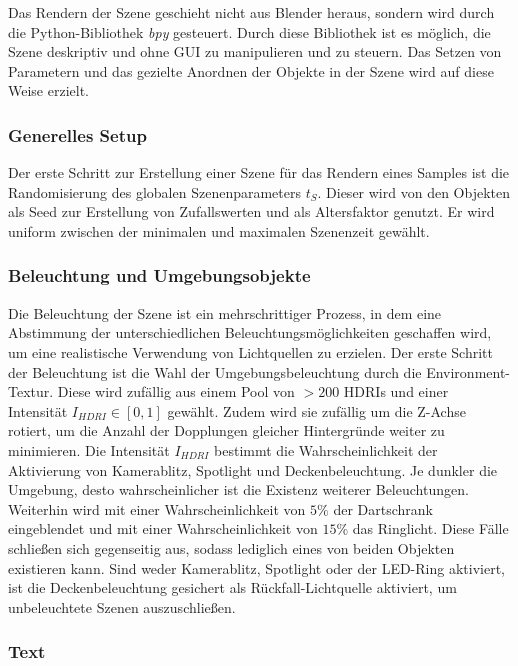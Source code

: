 Das Rendern der Szene geschieht nicht aus Blender heraus, sondern wird durch die Python-Bibliothek \textit{bpy} gesteuert. Durch diese Bibliothek ist es möglich, die Szene deskriptiv und ohne GUI zu manipulieren und zu steuern. Das Setzen von Parametern und das gezielte Anordnen der Objekte in der Szene wird auf diese Weise erzielt.

\subsubsection{Generelles Setup}
\label{sec:impl:daten:python:setup}

Der erste Schritt zur Erstellung einer Szene für das Rendern eines Samples ist die Randomisierung des globalen Szenenparameters $t_S$. Dieser wird von den Objekten als Seed zur Erstellung von Zufallswerten und als Altersfaktor genutzt. Er wird uniform zwischen der minimalen und maximalen Szenenzeit gewählt.

\subsubsection{Beleuchtung und Umgebungsobjekte}
\label{sec:impl:daten:python:licht}

Die Beleuchtung der Szene ist ein mehrschrittiger Prozess, in dem eine Abstimmung der unterschiedlichen Beleuchtungsmöglichkeiten geschaffen wird, um eine realistische Verwendung von Lichtquellen zu erzielen. Der erste Schritt der Beleuchtung ist die Wahl der Umgebungsbeleuchtung durch die Environment-Textur. Diese wird zufällig aus einem Pool von $>200$ HDRIs und einer Intensität $I_{HDRI} \in [0, 1]$ gewählt. Zudem wird sie zufällig um die Z-Achse rotiert, um die Anzahl der Dopplungen gleicher Hintergründe weiter zu minimieren. Die Intensität $I_{HDRI}$ bestimmt die Wahrscheinlichkeit der Aktivierung von Kamerablitz, Spotlight und Deckenbeleuchtung. Je dunkler die Umgebung, desto wahrscheinlicher ist die Existenz weiterer Beleuchtungen.
Weiterhin wird mit einer Wahrscheinlichkeit von $5\%$ der Dartschrank eingeblendet und mit einer Wahrscheinlichkeit von $15\%$ das Ringlicht. Diese Fälle schließen sich gegenseitig aus, sodass lediglich eines von beiden Objekten existieren kann.
Sind weder Kamerablitz, Spotlight oder der LED-Ring aktiviert, ist die Deckenbeleuchtung gesichert als Rückfall-Lichtquelle aktiviert, um unbeleuchtete Szenen auszuschließen.

\subsubsection{Text}
\label{sec:impl:daten:python:text}

